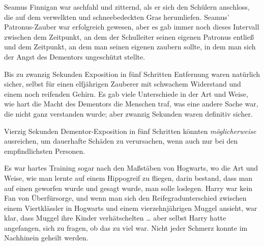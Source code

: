\later

Seamus Finnigan war aschfahl und zitternd, als er sich den Schülern anschloss, die auf dem verwelkten und schneebedeckten Gras herumliefen. Seamus’ Patronus-Zauber war erfolgreich gewesen, aber es gab immer noch dieses Intervall zwischen dem Zeitpunkt, an dem der Schulleiter seinen eigenen Patronus entließ und dem Zeitpunkt, an dem man seinen eigenen zaubern sollte, in dem man sich der Angst des Dementors ungeschützt stellte.

Bis zu zwanzig Sekunden Exposition in fünf Schritten Entfernung waren natürlich sicher, selbst für einen elfjährigen Zauberer mit schwachem Widerstand und einem noch reifenden Gehirn. Es gab viele Unterschiede in der Art und Weise, wie hart die Macht des Dementors die Menschen traf, was eine andere Sache war, die nicht ganz verstanden wurde; aber zwanzig Sekunden waren definitiv sicher.

Vierzig Sekunden Dementor-Exposition in fünf Schritten könnten \emph{möglicherweise} ausreichen, um dauerhafte Schäden zu verursachen, wenn auch nur bei den empfindlichsten Personen.

Es war hartes Training sogar nach den Maßstäben von Hogwarts, wo die Art und Weise, wie man lernte auf einem Hippogreif zu fliegen, darin bestand, dass man auf einen geworfen wurde und gesagt wurde, man solle loslegen. Harry war kein Fan von Überfürsorge, und wenn man sich den Reifegradunterschied zwischen einem Viertklässler in Hogwarts und einem vierzehnjährigen Muggel ansieht, war klar, dass Muggel ihre Kinder verhätschelten … aber selbst Harry hatte angefangen, sich zu fragen, ob das zu viel war. Nicht jeder Schmerz konnte im Nachhinein geheilt werden.

